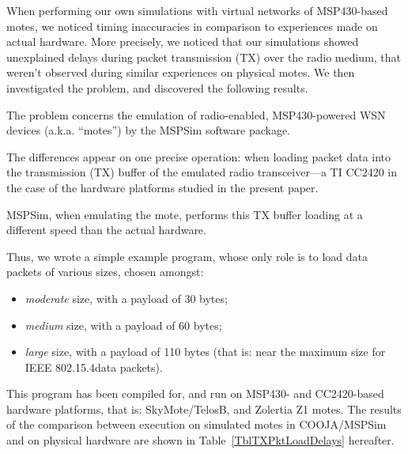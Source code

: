 \documentclass[a4paper,10pt]{article}
\begin{document}
When performing our own simulations with virtual networks of MSP430-based
motes, we noticed timing inaccuracies in comparison to experiences made
on actual hardware. More precisely, we noticed that our simulations showed
unexplained delays during packet transmission (TX) over the radio medium,
that weren't observed during similar experiences on physical motes.
We then investigated the problem, and discovered the following results.

The problem concerns the emulation of radio-enabled, MSP430-powered WSN
devices (a.k.a. ``motes'') by the MSPSim software package.

The differences appear on one precise operation: when loading packet data
into the transmission (TX) buffer of the emulated radio transceiver---a TI
CC2420 in the case of the hardware platforms studied in the present paper.

MSPSim, when emulating the mote, performs this TX buffer loading at
a different speed than the actual hardware.

Thus, we wrote a simple example program, whose only role is to load data
packets of various sizes, chosen amongst:
\begin{itemize}
\item \emph{moderate} size, with a payload of 30 bytes;
\item \emph{medium} size, with a payload of 60 bytes;
\item \emph{large} size, with a payload of 110 bytes (that is:
      near the maximum size for IEEE 802.15.4\footnotemark[1] data packets).
\end{itemize}
This program has been compiled for, and run on MSP430- and CC2420-based
hardware platforms, that is: SkyMote/TelosB, and Zolertia Z1 motes.
The results of the comparison between execution on simulated motes
in COOJA/MSPSim and on physical hardware are shown in
Table~\ref{TblTXPktLoadDelays} hereafter.
\end{document}
